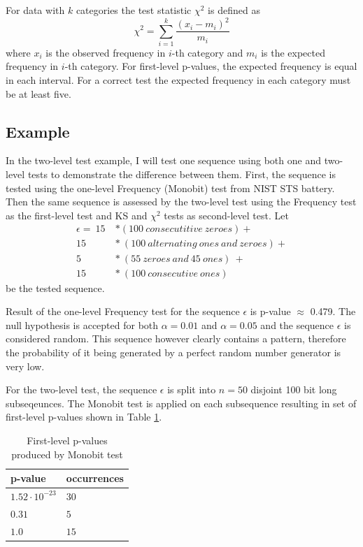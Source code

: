 \documentclass[
  digital,     %
  oneside,     %
  nosansbold,  %
  nocolorbold, %
  nolof,         %
  nolot,         %
]{fithesis4}
\begin{document}
For data with $k$ categories the test statistic $\chi^2$ is defined as \[\chi^2 = \sum_{i=1}^{k} \dfrac{(x_i - m_i)^2}{m_i} \]
where $x_i$ is the observed frequency in $i$-th category and $m_i$ is the expected frequency in $i$-th category. For first-level p-values, the expected frequency is equal in each interval. For a correct test the expected frequency in each category must be at least five. \cite[p. 171]{stat-procedures}

\subsection{Example}

In the two-level test example, I will test one sequence using both one and two-level tests to demonstrate the difference between them. First, the sequence is tested using the one-level Frequency (Monobit) test from NIST STS battery.\cite[p. 2-2]{nist_special} Then the same sequence is assessed by the two-level test using the Frequency test as the first-level test and KS and $\chi^2$ tests as second-level test. Let
\[\begin{split}
    \epsilon =\:15\: &* (100\:consecutitive\:zeroes) + \\
    15\:&*\:(100\:alternating\:ones\:and\:zeroes) + \\
    5\:&*\:(55\:zeroes\:and\:45\:ones)\:+\:\\
    15\:&*\:(100\:consecutive\:ones)
\end{split}\]
be the tested sequence. 

Result of the one-level Frequency test for the sequence $\epsilon$ is p-value $\approx$ 0.479. The null hypothesis is accepted for both $\alpha = 0.01$ and $\alpha = 0.05$ and the sequence $\epsilon$ is considered random. This sequence however clearly contains a pattern, therefore the probability of it being generated by a perfect random number generator is very low.

For the two-level test, the sequence $\epsilon$ is split into $n=50$  disjoint 100 bit long subseqeunces. The Monobit test is applied on each subsequence resulting in set of first-level p-values shown in Table \ref{tab:first_pvalues}.

\begin{table}
  \begin{tabularx}{0.4\textwidth}{ll}
    \toprule
    p-value & occurrences  \\
    \midrule
    $1.52 \cdot 10^{-23}$ & $30$\\
    $0.31$ & $5$\\
    $1.0$ & $15$\\
    \bottomrule
  \end{tabularx}
  \caption{First-level p-values produced by Monobit test}
  \label{tab:first_pvalues}
\end{table}
\end{document}
